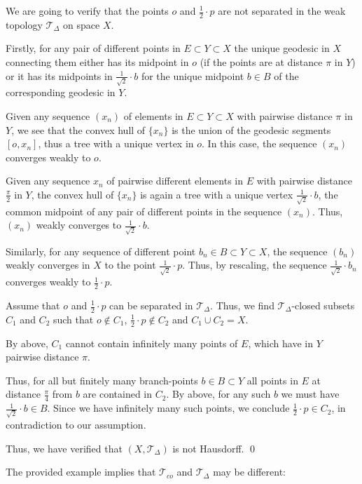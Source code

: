 \documentclass[12pt,leqno]{amsart}
\numberwithin{equation}{section}
\theoremstyle{remark}
\begin{document}
We are going to verify that the points $o$ and $\frac 1 2 \cdot p$ are not separated in 
the weak topology $\mathcal T_{\Delta}$ on space $X$.

Firstly, for any pair of different points in $E\subset Y\subset X$ the unique geodesic in $X$ connecting them 
either has its midpoint in $o$ (if the points are at distance $\pi$ in $Y$) or it has its midpoints in $\frac 1 {\sqrt 2} \cdot b$ for the unique midpoint $b\in B$ of the corresponding geodesic in $Y$. 

Given any sequence $(x_n)$ of elements in $E\subset Y\subset X$ with pairwise distance $\pi$ in $Y$, we see that the convex hull of $\{ x_n \}$ is the union of the geodesic segments $[o,x_n]$,
thus a tree with a unique vertex in $o$.
In this case, the sequence $(x_n)$ converges weakly to $o$.

Given any sequence $x_n$ of pairwise different elements in $E$ with pairwise distance $\frac \pi 2$ in $Y$, the convex hull of $\{ x_n \}$ is again a tree with a unique vertex
$\frac 1 {\sqrt 2} \cdot b$, the common
midpoint of any pair of different points in the sequence $(x_n)$. Thus, $(x_n)$ weakly converges to $\frac 1 {\sqrt 2} \cdot b$.

Similarly, for any sequence of different point $b_n \in B\subset Y\subset X$, the sequence $(b_n)$ weakly converges in $X$ to the point $\frac 1 {\sqrt 2} \cdot p$. Thus, by rescaling, the sequence $\frac 1 {\sqrt 2} \cdot b_n$ converges weakly to $\frac 1 2 \cdot p$.

Assume that $o$ and $\frac 1 2 \cdot p$ can be separated in $\mathcal T_{\Delta}$. Thus, we find $\mathcal T_{\Delta}$-closed subsets $C_1$ and $C_2$ such that $o\notin C_1$, $\frac 1 2 \cdot p\notin C_2$ and $C_1\cup C_2 = X$.

By above, $C_1$ cannot contain infinitely many points of $E$, which have in $Y$ pairwise distance $\pi$. 

Thus, for all but finitely many branch-points $b\in B \subset Y$ all points in $E$ at distance $\frac \pi 4$ from $b$ are contained in $C_2$. By above, for any such $b$ we must have $\frac 1 {\sqrt 2} \cdot b \in B$. Since we have infinitely many such points, we conclude $\frac 1 2 \cdot p\in C_2$, in contradiction to our assumption.
 
 
Thus, we have verified that $(X, \mathcal T_{\Delta})$ is not Hausdorff.
\qed
 

The provided example implies that $\mathcal T_{co}$ and $\mathcal T_{\Delta}$ may be different: 
\end{document}
